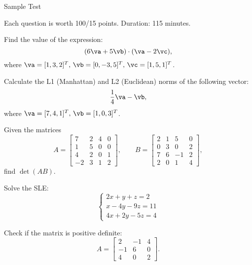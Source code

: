  \begin{center}\begin{large} Sample Test
 \vspace{1em}
 
 \end{large}\end{center}
 \small Each question is worth 100/15 points. Duration: 115 minutes.
 \bigskip

 
\begin{problem}
Find the value of the expression:
\[ (6\va+5\vb)\cdot (\va-2\vc), \]
where $\va=[1, 3, 2]^T,\,\vb=[0, -3, 5]^T,\,\vc=[1, 5, 1]^T$.
\end{problem}
\medskip

\begin{problem}
Calculate the L1 (Manhattan) and L2 (Euclidean) norms of the following vector:
\[ \dfrac{1}{4}\va-\vb, \]
where $\va=[7,4,1]^T,\,\vb=[1,0,3]^T$.
\end{problem}

\medskip

\begin{problem}
Given the matrices
\[ A = \begin{bmatrix}
7& 2 &4 &0\\
1 &5 &0 &0\\
4 &2 &0& 1\\
−2 &3 &1 &2
\end{bmatrix},\qquad B = \begin{bmatrix}
2 &1 &5&0\\
0 &3& 0&2\\
7 &6 &-1&2\\
2&0&1&4
\end{bmatrix}, \]
find $\det(AB)$.
\end{problem}
\medskip



\begin{problem}
Solve the SLE:
\[
\begin{cases}
    2x+y+z = 2\\
    x - 4y - 9z = 11\\
    4x + 2y - 5z = 4
\end{cases}
 \]
\end{problem}
\medskip


\begin{problem}
Check if the matrix is positive definite:
\[ A = \begin{bmatrix}
2& -1& 4\\
-1& 6 &0\\
4& 0& 2
\end{bmatrix}.\]
\end{problem}
\medskip


